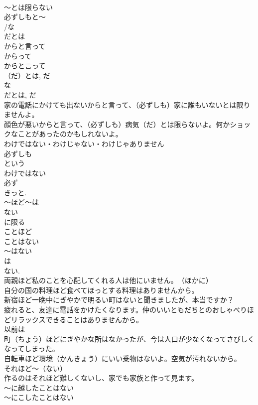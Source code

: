 \documentclass[8pt]{extreport}
\begin{document}
\begin{CJK}{UTF8}{min}
\\	～とは限らない
\\	必ずしもと～
\\	/な
\\	だとは 
\\	からと言って 
\\	からって 
\\	からと言って
\\	（だ）とは, だ 
\\	な
\\	だとは, だ 
\\	家の電話にかけても出ないからと言って、（必ずしも）家に誰もいないとは限りませんよ。
\\	顔色が悪いからと言って、（必ずしも）病気（だ）とは限らないよ。何かショックなことがあったのかもしれないよ。
\\	わけではない・わけじゃない・わけじゃありません 
\\	必ずしも
\\	という
\\	わけではない
\\	必ず 
\\	きっと.
\\	～ほど～は
\\	ない
\\	に限る
\\	ことほど
\\	ことはない
\\	～はない 
\\	は 
\\	ない. 
\\	両親ほど私のことを心配してくれる人は他にいません。　（ほかに）
\\	自分の国の料理ほど食べてほっとする料理はありませんから。
\\	新宿ほど一晩中にぎやかで明るい町はないと聞きましたが、本当ですか？
\\	疲れると、友達に電話をかけたくなります。仲のいいともだちとのおしゃべりほどリラックスできることはありませんから。
\\	以前は
\\	町（ちょう）ほどにぎやかな所はなかったが、今は人口が少なくなってさびしくなってしまった。
\\	自転車ほど環境（かんきょう）にいい乗物はないよ。空気が汚れないから。
\\	それほど～（ない）
\\	作るのはそれほど難しくないし、家でも家族と作って見ます。
\\	～に越したことはない
\\	～にこしたことはない

\end{CJK}
\end{document}
